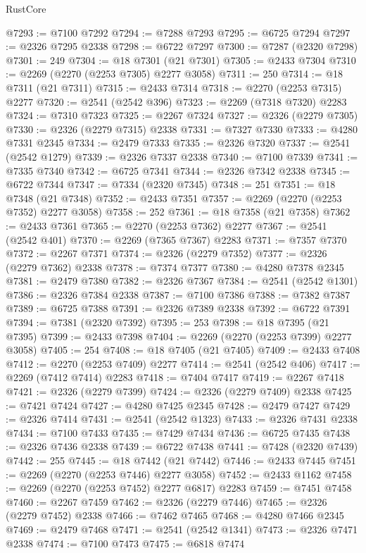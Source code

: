 \begin{lexlean}{RustCore}
\begin{coremodule}
@7293 := @7100 @7292
@7294 := @7288 @7293
@7295 := @6725 @7294
@7297 := @2326 @7295 @2338
@7298 := @6722 @7297
@7300 := @7287 (@2320 @7298)
@7301 := 249
@7304 := @18 @7301 (@21 @7301)
@7305 := @2433 @7304
@7310 := @2269 (@2270 (@2253 @7305) @2277 @3058)
@7311 := 250
@7314 := @18 @7311 (@21 @7311)
@7315 := @2433 @7314
@7318 := @2270 (@2253 @7315) @2277
@7320 := @2541 (@2542 @396)
@7323 := @2269 (@7318 @7320) @2283
@7324 := @7310 @7323
@7325 := @2267 @7324
@7327 := @2326 (@2279 @7305)
@7330 := @2326 (@2279 @7315) @2338
@7331 := @7327 @7330
@7333 := @4280 @7331 @2345
@7334 := @2479 @7333
@7335 := @2326 @7320
@7337 := @2541 (@2542 @1279)
@7339 := @2326 @7337 @2338
@7340 := @7100 @7339
@7341 := @7335 @7340
@7342 := @6725 @7341
@7344 := @2326 @7342 @2338
@7345 := @6722 @7344
@7347 := @7334 (@2320 @7345)
@7348 := 251
@7351 := @18 @7348 (@21 @7348)
@7352 := @2433 @7351
@7357 := @2269 (@2270 (@2253 @7352) @2277 @3058)
@7358 := 252
@7361 := @18 @7358 (@21 @7358)
@7362 := @2433 @7361
@7365 := @2270 (@2253 @7362) @2277
@7367 := @2541 (@2542 @401)
@7370 := @2269 (@7365 @7367) @2283
@7371 := @7357 @7370
@7372 := @2267 @7371
@7374 := @2326 (@2279 @7352)
@7377 := @2326 (@2279 @7362) @2338
@7378 := @7374 @7377
@7380 := @4280 @7378 @2345
@7381 := @2479 @7380
@7382 := @2326 @7367
@7384 := @2541 (@2542 @1301)
@7386 := @2326 @7384 @2338
@7387 := @7100 @7386
@7388 := @7382 @7387
@7389 := @6725 @7388
@7391 := @2326 @7389 @2338
@7392 := @6722 @7391
@7394 := @7381 (@2320 @7392)
@7395 := 253
@7398 := @18 @7395 (@21 @7395)
@7399 := @2433 @7398
@7404 := @2269 (@2270 (@2253 @7399) @2277 @3058)
@7405 := 254
@7408 := @18 @7405 (@21 @7405)
@7409 := @2433 @7408
@7412 := @2270 (@2253 @7409) @2277
@7414 := @2541 (@2542 @406)
@7417 := @2269 (@7412 @7414) @2283
@7418 := @7404 @7417
@7419 := @2267 @7418
@7421 := @2326 (@2279 @7399)
@7424 := @2326 (@2279 @7409) @2338
@7425 := @7421 @7424
@7427 := @4280 @7425 @2345
@7428 := @2479 @7427
@7429 := @2326 @7414
@7431 := @2541 (@2542 @1323)
@7433 := @2326 @7431 @2338
@7434 := @7100 @7433
@7435 := @7429 @7434
@7436 := @6725 @7435
@7438 := @2326 @7436 @2338
@7439 := @6722 @7438
@7441 := @7428 (@2320 @7439)
@7442 := 255
@7445 := @18 @7442 (@21 @7442)
@7446 := @2433 @7445
@7451 := @2269 (@2270 (@2253 @7446) @2277 @3058)
@7452 := @2433 @1162
@7458 := @2269 (@2270 (@2253 @7452) @2277 @6817) @2283
@7459 := @7451 @7458
@7460 := @2267 @7459
@7462 := @2326 (@2279 @7446)
@7465 := @2326 (@2279 @7452) @2338
@7466 := @7462 @7465
@7468 := @4280 @7466 @2345
@7469 := @2479 @7468
@7471 := @2541 (@2542 @1341)
@7473 := @2326 @7471 @2338
@7474 := @7100 @7473
@7475 := @6818 @7474

\end{coremodule}
\end{lexlean}

